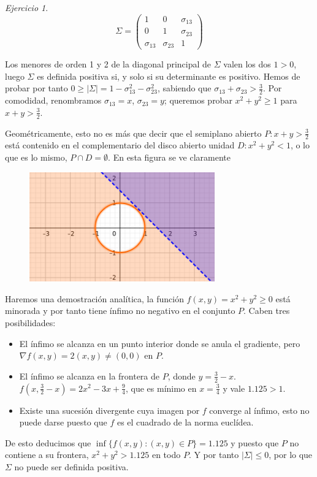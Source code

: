 \documentclass[12pt,spanish]{article}
\theoremstyle{definition}
\theoremstyle{remark}
\newtheorem{exercise}{Ejercicio}
\begin{document}
\setcounter{exercise}{4}
\begin{exercise} %
  \[\Sigma=
    \begin{pmatrix}
      1 & 0 & \sigma_{13} \\
      0 & 1 & \sigma_{23} \\
      \sigma_{13} & \sigma_{23} & 1
    \end{pmatrix}
  \]

  Los menores de orden 1 y 2 de la diagonal principal de $\Sigma$
  valen los dos $1>0$, luego $\Sigma$ es definida positiva si, y solo
  si su determinante es positivo. Hemos de probar por tanto
  $0\geq|\Sigma|=1-\sigma_{13}^2-\sigma_{23}^2$, sabiendo que
  $\sigma_{13}+\sigma_{23}>\frac{3}{2}$. Por comodidad, renombramos
  $\sigma_{13}=x$, $\sigma_{23}=y$; queremos probar $x^2+y^2\geq 1$
  para $x+y>\frac{3}{2}$.

  Geométricamente, esto no es más que decir que el semiplano abierto
  $P:x+y>\frac{3}{2}$ está contenido en el complementario del disco
  abierto unidad $D:x^2+y^2 < 1$, o lo que es lo mismo,
  $P\cap D=\emptyset$. En esta figura se ve claramente
  \begin{figure}[H]
    \centering
    \includegraphics[width=80mm]{ej1-5.png}
  \end{figure}

  Haremos una demostración analítica, la función
  $f(x,y)=x^2+y^2\geq 0$ está minorada y por tanto tiene ínfimo no
  negativo en el conjunto $P$. Caben tres posibilidades:
  \begin{itemize}
  \item El ínfimo se alcanza en un punto interior donde se anula el
    gradiente, pero $\nabla f(x,y)=2(x,y)\neq(0,0)$ en $P$.
  \item El ínfimo se alcanza en la frontera de $P$, donde
    $y=\frac{3}{2}-x$. $f(x,\frac{3}{2}-x)=2x^2-3x+\frac{9}{4}$, que
    es mínimo en $x=\frac{3}{4}$ y vale $1.125>1$.
  \item Existe una sucesión divergente cuya imagen por $f$ converge al
    ínfimo, esto no puede darse puesto que $f$ es el cuadrado de la
    norma euclídea.
  \end{itemize}

  De esto deducimos que $\inf\{f(x,y) : (x,y)\in P\}=1.125$ y puesto
  que $P$ no contiene a su frontera, $x^2+y^2>1.125$ en todo $P$. Y
  por tanto $|\Sigma|\leq 0$, por lo que $\Sigma$ no puede ser
  definida positiva.
\end{exercise}
\end{document}

